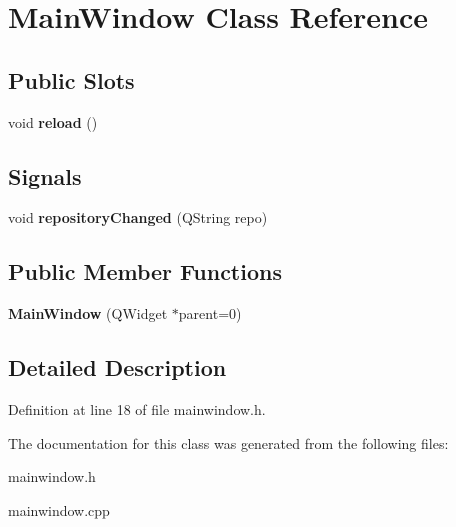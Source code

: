 \hypertarget{class_main_window}{
\section{MainWindow Class Reference}
\label{class_main_window}
}
\subsection*{Public Slots}
\begin{DoxyCompactItemize}
\item 
\hypertarget{class_main_window_a8d0b730949e37119690b8d29491c3aa0}{
void {\bfseries reload} ()}
\label{class_main_window_a8d0b730949e37119690b8d29491c3aa0}

\end{DoxyCompactItemize}
\subsection*{Signals}
\begin{DoxyCompactItemize}
\item 
\hypertarget{class_main_window_ab455c90c99cedcf2564a8ae199620de4}{
void {\bfseries repositoryChanged} (QString repo)}
\label{class_main_window_ab455c90c99cedcf2564a8ae199620de4}

\end{DoxyCompactItemize}
\subsection*{Public Member Functions}
\begin{DoxyCompactItemize}
\item 
\hypertarget{class_main_window_a8b244be8b7b7db1b08de2a2acb9409db}{
{\bfseries MainWindow} (QWidget $\ast$parent=0)}
\label{class_main_window_a8b244be8b7b7db1b08de2a2acb9409db}

\end{DoxyCompactItemize}


\subsection{Detailed Description}


Definition at line 18 of file mainwindow.h.



The documentation for this class was generated from the following files:\begin{DoxyCompactItemize}
\item 
mainwindow.h\item 
mainwindow.cpp\end{DoxyCompactItemize}
